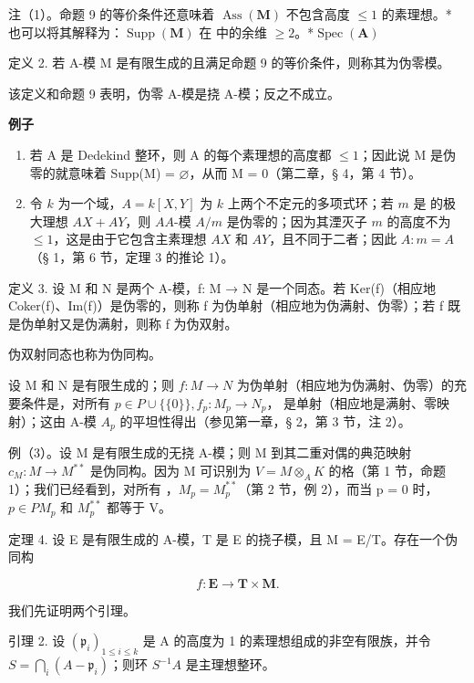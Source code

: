 注（1）。命题 9 的等价条件还意味着 \(\operatorname{Ass}(\mathbf{M})\) 不包含高度 \(\leqslant 1\) 的素理想。* 也可以将其解释为：\(\operatorname{Supp}(\mathbf{M})\) 在  中的余维 \(\geqslant 2\)。*\(\operatorname{Spec}(\mathbf{A})\)

定义 2. 若 A-模 M 是有限生成的且满足命题 9 的等价条件，则称其为伪零模。

该定义和命题 9 表明，伪零 A-模是挠 A-模；反之不成立。

\textbf{例子}\par

\begin{enumerate}
\def\labelenumi{(\arabic{enumi})}
\item
  若 A 是 Dedekind 整环，则 A 的每个素理想的高度都 \(\leqslant1\)；因此说 M 是伪零的就意味着 Supp(M) = \(\varnothing\)，从而 M = 0（第二章，§ 4，第 4 节）。
\item
  令 \(k\) 为一个域，\(A = k[X, Y]\) 为 \(k\) 上两个不定元的多项式环；若 \(m\) 是  的极大理想 \(AX + AY\)，则 \(A\)\(A\)-模 \(A/m\) 是伪零的；因为其湮灭子 \(m\) 的高度不为 \(\leqslant 1\)，这是由于它包含主素理想 \(AX\) 和 \(AY\)，且不同于二者；因此 \(A: m = A\)（§ 1，第 6 节，定理 3 的推论 1）。
\end{enumerate}

定义 3. 设 M 和 N 是两个 A-模，f: M → N 是一个同态。若 Ker(f)（相应地 Coker(f)、Im(f)）是伪零的，则称 f 为伪单射（相应地为伪满射、伪零）；若 f 既是伪单射又是伪满射，则称 f 为伪双射。

伪双射同态也称为伪同构。

设 M 和 N 是有限生成的；则 \(f: M \to N\) 为伪单射（相应地为伪满射、伪零）的充要条件是，对所有 \(p \in P \cup \{\{0\}\}, f_{p}: M_{p} \to N_{p}\)， 是单射（相应地是满射、零映射）；这由 A-模 \(A_{p}\) 的平坦性得出（参见第一章，§ 2，第 3 节，注 2）。

例（3）。设 M 是有限生成的无挠 A-模；则 M 到其二重对偶的典范映射 \(c_{M}: M \to M^{**}\) 是伪同构。因为 M 可识别为 \(V = M \otimes_{A} K\) 的格（第 1 节，命题 1）；我们已经看到，对所有 ，\(M_{p} = M_{p}^{**}\)（第 2 节，例 2），而当 p = 0 时，\(p \in P\)\(M_{p}\) 和 \(M_{p}^{**}\) 都等于 V。

定理 4. 设 E 是有限生成的 A-模，T 是 E 的挠子模，且 M = E/T。存在一个伪同构

\[
f \colon \mathbf {E} \rightarrow \mathbf {T} \times \mathbf {M}.
\]

我们先证明两个引理。

引理 2. 设 \((\mathfrak{p}_i)_{1 \leqslant i \leqslant k}\) 是 A 的高度为 1 的素理想组成的非空有限族，并令 \(S = \bigcap_{i} (A - \mathfrak{p}_i)\)；则环 \(S^{-1}A\) 是主理想整环。

